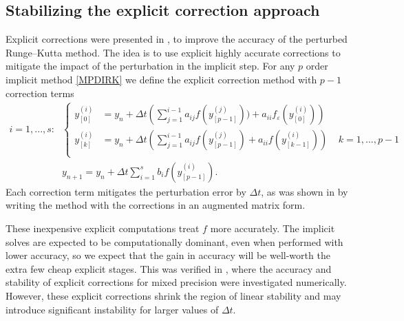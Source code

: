\documentclass{siamart251104}
\newcommand{\dt}{\Delta t}
\begin{document}
\subsection{Stabilizing the explicit correction approach}
Explicit corrections were presented in \cite{Grant2022}, 
to improve the accuracy of the  perturbed Runge--Kutta method. The idea is to use explicit highly accurate corrections to mitigate the impact of the perturbation in the implicit step. 
For any  $p$ order implicit method \eqref{MPDIRK} we define the explicit correction method  with $p-1$ correction terms
\begin{subequations} \label{MPDIRKexpC}
\begin{align} 
\mbox{$i=1, . . ., s$:} 
& \left\{\begin{aligned} 
 y^{(i)}_{[0]} & =  y_n + 
    \dt \left( \sum_{j=1}^{i-1} a_{ij} f(y^{(j)}_{[p-1]}))
    + a_{ii} f_{\varepsilon}(y^{(i)}_{[0]}) \right) \\
 y^{(i)}_{[k]} & =  y_n + 
    \dt \left( \sum_{j=1}^{i-1} a_{ij} f(y^{(j)}_{[p-1]})
    + a_{ii} f(y^{(i)}_{[k-1]}) \right) 
    \; \; \; \; k=1, . . ., p-1\\
    \end{aligned} \right. \\
& y_{n+1}  =  y_n + \dt \sum_{i=1}^s b_{i} f(y^{(i)}_{[p-1]}) .
\end{align}
\end{subequations}
Each correction term mitigates the perturbation error 
by $\dt$, as was shown in \cite{Grant2022}
by writing the method with the corrections in an
augmented matrix form.

These inexpensive explicit computations treat $f$ more accurately.   
The implicit solves are expected to be computationally dominant, 
even when performed with lower accuracy, so we expect that  the gain in accuracy 
will be well-worth the extra few cheap explicit stages. This was verified in \cite{Burnett1, Burnett2}, where 
the accuracy and stability of explicit corrections for mixed precision were investigated numerically.
However, these explicit corrections shrink the region of linear stability and may introduce significant 
instability for larger values of  $\dt$.


\end{document}
